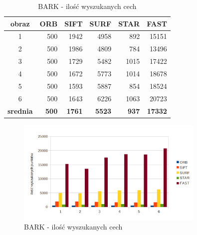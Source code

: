 \begin{table}[htbp]
  \centering
  \caption{BARK - ilość wyszukanych cech}
    \begin{tabular}{|c|r|r|r|r|r|}\hline
    
    obraz & \textbf{ORB} & \textbf{SIFT} & \textbf{SURF} & \textbf{STAR} & \textbf{FAST} \\\hline
    
    1 & 500 & 1942 & 4958 & 892 & 15151 \\
    2 & 500 & 1986 & 4809 & 784 & 13496 \\
    3 & 500 & 1729 & 5482 & 1015 & 17422 \\
    4 & 500 & 1672 & 5773 & 1014 & 18678 \\
    5 & 500 & 1593 & 5887 & 854 & 18524 \\
    6 & 500 & 1643 & 6226 & 1063 & 20723 \\\hline
    \textbf{srednia} & \textbf{500} & \textbf{1761} & \textbf{5523} & \textbf{937} & \textbf{17332} \\\hline
    
    \end{tabular}%
  \label{tab:bark_f1}%
\end{table}%


\begin{figure}
\centering
\includegraphics[width=0.8\textwidth]{pict/mikolajczyk/bark/F1.png}
\caption{BARK - ilość wyszukanych cech}
\label{fig:bark_f1}
\end{figure}


